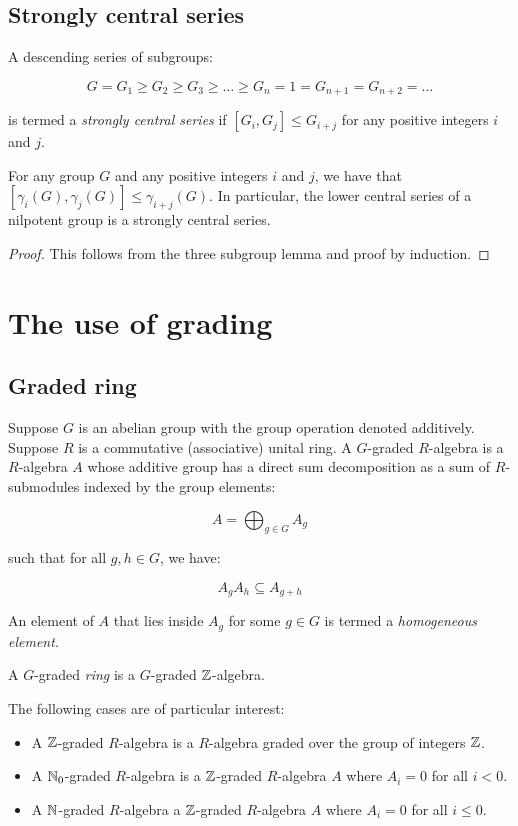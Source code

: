 \subsection{Strongly central series}\label{appsec:strongly-central}

A descending series of subgroups:

$$G = G_1 \ge G_2 \ge G_3 \ge \dots \ge G_n = 1 = G_{n+1} = G_{n+2} = \dots$$

is termed a {\em strongly central series} if $[G_i,G_j] \le G_{i+j}$
for any positive integers $i$ and $j$.

\begin{lemma}
  For any group $G$ and any positive integers $i$ and $j$, we have
  that $[\gamma_i(G),\gamma_j(G)] \le \gamma_{i+j}(G)$. In particular,
  the lower central series of a nilpotent group is a strongly central series.
\end{lemma}

\begin{proof}
  This follows from the three subgroup lemma and proof by induction.
\end{proof}


\section{The use of grading}

\subsection{Graded ring}

Suppose $G$ is an abelian group with the group operation denoted
additively. Suppose $R$ is a commutative (associative) unital ring. A
$G$-graded $R$-algebra is a $R$-algebra $A$ whose additive group has a
direct sum decomposition as a sum of $R$-submodules indexed by the
group elements:

$$A = \bigoplus_{g \in G} A_g$$

such that for all $g,h \in G$, we have:

$$A_gA_h \subseteq A_{g+h}$$

An element of $A$ that lies inside $A_g$ for some $g \in G$ is termed
a {\em homogeneous element}.

A $G$-graded {\em ring} is a $G$-graded $\mathbb{Z}$-algebra.

The following cases are of particular interest:

\begin{itemize}
\item A $\mathbb{Z}$-graded $R$-algebra is a $R$-algebra graded over the group
  of integers $\mathbb{Z}$.
\item A $\mathbb{N}_0$-graded $R$-algebra is a $\mathbb{Z}$-graded $R$-algebra $A$
  where $A_i = 0$ for all $i < 0$.
\item A $\mathbb{N}$-graded $R$-algebra a $\mathbb{Z}$-graded $R$-algebra $A$ where
  $A_i = 0$ for all $i \le 0$.
\end{itemize}

